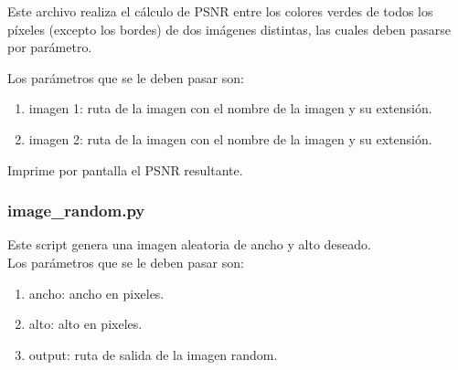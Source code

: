 Este archivo realiza el cálculo de PSNR entre los colores verdes de todos los píxeles (excepto los bordes) de dos imágenes distintas, las cuales deben pasarse por parámetro.

Los parámetros que se le deben pasar son:
\begin{enumerate}
\item imagen 1: ruta de la imagen con el nombre de la imagen y su extensi\'on. 
\item imagen 2: ruta de la imagen con el nombre de la imagen y su extensi\'on.
\end{enumerate}

Imprime por pantalla el PSNR resultante.

\subsubsection{image\_random.py}

Este script genera una imagen aleatoria de ancho y alto deseado.\\
Los parámetros que se le deben pasar son:\\
\begin{enumerate}
\item ancho: ancho en pixeles. 
\item alto: alto en pixeles.
\item output: ruta de salida de la imagen random.
\end{enumerate}


